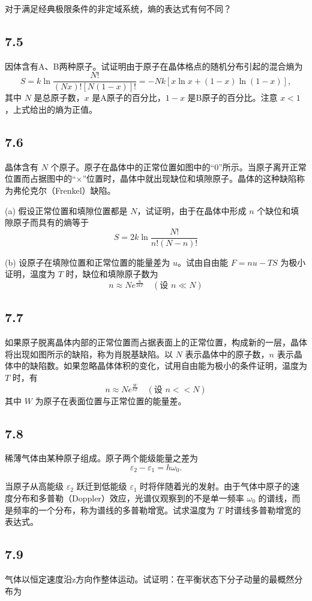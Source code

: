 对于满足经典极限条件的非定域系统，熵的表达式有何不同？

\newpage
\subsection{7.5}
因体含有A、B两种原子。试证明由于原子在晶体格点的随机分布引起的混合熵为
$$S = k \ln \frac{N!}{(Nx)! [N(1-x)]!} = -Nk \left[ x \ln x + (1-x) \ln (1-x) \right],$$
其中 $ N $ 是总原子数，$ x $ 是A原子的百分比，$ 1-x $ 是B原子的百分比。注意 $ x < 1 $，上式给出的熵为正值。

\newpage
\subsection{7.6}
晶体含有 $N$ 个原子。原子在晶体中的正常位置如图中的“0”所示。当原子离开正常位置而占据图中的“×”位置时，晶体中就出现缺位和填隙原子。晶体的这种缺陷称为弗伦克尔（Frenkel）缺陷。

(a) 假设正常位置和填隙位置都是 $N$，试证明，由于在晶体中形成 $n$ 个缺位和填隙原子而具有的熵等于
$$ S = 2k \ln \frac{N!}{n!(N-n)!} $$

(b) 设原子在填隙位置和正常位置的能量差为 $u$。试由自由能 $F = nu-TS$ 为极小证明，温度为 $T$ 时，缺位和填隙原子数为
$$ n \approx Ne^{\frac{u}{2kT}} \quad (\text{设 } n \ll N) $$

\newpage
\subsection{7.7}
如果原子脱离晶体内部的正常位置而占据表面上的正常位置，构成新的一层，晶体将出现如图所示的缺陷，称为肖脱基缺陷。以 $ N $ 表示晶体中的原子数，$ n $ 表示晶体中的缺陷数。如果忽略晶体体积的变化，试用自由能为极小的条件证明，温度为 $ T $ 时，有
$$ n \approx Ne^{\frac{W}{kT}} \quad (\text{设 } n << N) $$
其中 $ W $ 为原子在表面位置与正常位置的能量差。

\newpage
\subsection{7.8}
稀薄气体由某种原子组成。原子两个能级能量之差为 $$ \varepsilon_2 - \varepsilon_1 = h\omega_0. $$

当原子从高能级 $\varepsilon_2$ 跃迁到低能级 $\varepsilon_1$ 时将伴随着光的发射。由于气体中原子的速度分布和多普勒（Doppler）效应，光谱仪观察到的不是单一频率 $\omega_0$ 的谱线，而是频率的一个分布，称为谱线的多普勒增宽。试求温度为 $T$ 时谱线多普勒增宽的表达式。

\newpage
\subsection{7.9}
气体以恒定速度沿z方向作整体运动。试证明：在平衡状态下分子动量的最概然分布为

